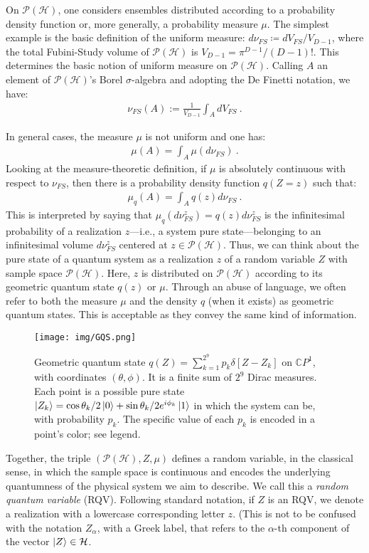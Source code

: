 \documentclass[draft,nofootinbib,pre,twocolumn,showkeys,superscriptaddress,preprintnumbers,floatfix]{revtex4-1}
\newcommand{\1}{\mathbbm{1}}
\newcommand{\PH}{\mathcal{P}(\mathcal{H})}
\begin{document}
On $\PH$, one considers ensembles distributed according to a probability
density function or, more generally, a probability measure $\mu$. The simplest example is
the basic definition of the uniform measure: $d\nu_{FS} \coloneqq dV_{FS} /
V_{D-1}$, where the total Fubini-Study volume of $\PH$ is $V_{D-1}
= \pi^{D-1} / (D-1)!$. This determines the basic notion of uniform measure
on $\PH$. Calling $A$ an element of $\PH$'s Borel $\sigma$-algebra and adopting
the De Finetti notation, we have:
\begin{align*}
\nu_{FS}(A) := \frac{1}{V_{D-1}} \int_{A} dV_{FS}
  ~.
\end{align*}

In general cases, the measure $\mu$ is not uniform and one has:
\begin{align*}
\mu(A) = \int_{A} \mu(d\nu_{FS})
  ~.
\end{align*}
Looking at the measure-theoretic definition, if $\mu$ is absolutely continuous
with respect to $\nu_{FS}$, then there is a probability density function $q(Z =
z)$ such that:
\begin{align*}
\mu_q(A) = \int_A q(z) d\nu_{FS}
  ~.
\end{align*}
This is interpreted by saying that $\mu_q(d\nu_{FS}^z) = q(z)d\nu_{FS}^z$ is
the infinitesimal probability of a realization $z$---i.e., a system pure
state---belonging to an infinitesimal volume $d\nu_{FS}^z$ centered at $z \in
\PH$. Thus, we can think about the pure state of a quantum system as a
realization $z$ of a random variable $Z$ with sample space $\PH$. Here, $z$ is
distributed on $\PH$ according to its geometric quantum state $q(z)$ or $\mu$.
Through an abuse of language, we often refer to both the measure $\mu$ and the
density $q$ (when it exists) as geometric quantum states. This is acceptable as
they convey the same kind of information. 

\begin{figure}[b]
\centering
\texttt{[image: img/GQS.png]}
\caption{Geometric quantum state $q(Z) = \sum_{k=1}^{2^9} p_k\delta[Z-Z_k]$
	on $\mathbb{C}P^1$, with coordinates $(\theta,\phi)$. It is a finite sum
	of $2^9$ Dirac measures. Each point is a possible pure state
	$\ket{Z_k} = \cos \theta_k/2 \ket{0} + \sin \theta_k/2
	e^{i\phi_k}\ket{1}$ in which the system can be, with probability $p_k$. The
	specific value of each $p_k$ is encoded in a point's color; see legend.
	}
\label{fig:GQS} 
\end{figure}

Together, the triple $(\PH,Z,\mu)$ defines a random variable, in the classical
sense, in which the sample space is continuous and encodes the underlying
quantumness of the physical system we aim to describe. We call this a
\emph{random quantum variable} (RQV). Following standard notation, if $Z$ is
an RQV, we denote a realization with a lowercase corresponding letter $z$.
(This is not to be confused with the notation $Z_\alpha$, with a Greek label,
that refers to the $\alpha$-th component of the vector $\ket{Z} \in \mathcal{H}$.
\end{document}
